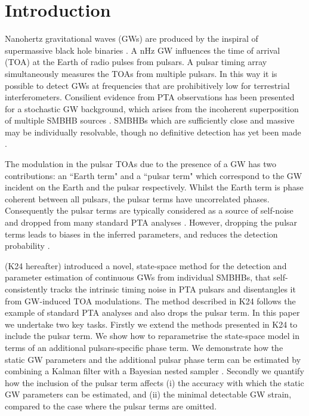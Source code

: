 \documentclass[fleqn,usenatbib,useAMS]{mnras}
\begin{document}
\section{Introduction}\label{sec:intro}
Nanohertz gravitational waves (GWs) are produced by the inspiral of supermassive black hole binaries \citep[SMBHBs;][]{Rajagopal1995,Jaffe_2003, Wyithe2003,Sesana2013,McWilliams_2014,Ravi2015MNRAS.447.2772R,Burke2019, Skyes2022}. A nHz GW influences the time of arrival (TOA) at the Earth of radio pulses from pulsars. A pulsar timing array \citep[PTA;][]{ Tiburzi2018, 2021hgwa.bookE...4V} simultaneously measures the TOAs from multiple pulsars. In this way it is possible to detect GWs at frequencies that are prohibitively low for terrestrial interferometers. Consilient evidence from PTA observations has been presented \citep{2023ApJ...951L...8A,2023arXiv230616214A,2023ApJ...951L...6R,2023RAA....23g5024X} for a stochastic GW background, which arises from the incoherent superposition of multiple SMBHB sources \citep{Allen1997,Sesana10,Christensen2019,Renzini2022}. SMBHBs which are sufficiently close and massive may be individually resolvable, though no definitive detection has yet been made \citep{Jenet2004,Zhu2014PPTA,Babak2016,Arzoumanian2023,2023arXiv230616226A}. \newline 

The modulation in the pulsar TOAs due to the presence of a GW has two contributions: an ``Earth term" and a ``pulsar term" which correspond to the GW incident on the Earth and the pulsar respectively. Whilst the Earth term is phase coherent between all pulsars, the pulsar terms have uncorrelated phases. Consequently the pulsar terms are typically considered as a source of self-noise and dropped from many standard PTA analyses \citep[e.g.][]{Sesana2010,Babak2012,Petiteau2013,Zhu2015,Taylors2016,Goldstein2018,Charisi2023arXiv230403786C}. However, dropping the pulsar terms leads to biases in the inferred parameters, and reduces the detection probability \citep{Zhupulsarterms,Chen2022,KimpsonPTA}. \newline 

\cite{KimpsonPTA} (K24 hereafter) introduced a novel, state-space method for the detection and parameter estimation of continuous GWs from individual SMBHBs, that self-consistently tracks the intrinsic timing noise in PTA pulsars \citep[e.g.][]{Shannon2010,Lasky2015,Caballero2016,Goncharov2021} and disentangles it from GW-induced TOA modulations. The method described in K24 follows the example of standard  PTA analyses and also drops the pulsar term. In this paper we undertake two key tasks. Firstly we extend the methods presented in K24 to include the pulsar term. We show how to reparametrise the state-space model in terms of an additional pulsars-specific phase term. We demonstrate how the static GW parameters and the additional pulsar phase term can be estimated by combining a Kalman filter \citep{Kalman1} with a Bayesian nested sampler \citep{Skilling, Ashton2022}. Secondly we quantify how the inclusion of the pulsar term affects (i) the accuracy with which the static GW parameters can be estimated, and (ii) the minimal detectable GW strain, compared to the case where the pulsar terms are omitted.  \newline 
\end{document}
